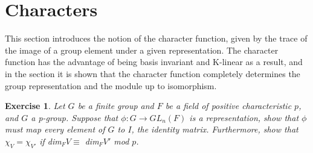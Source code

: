 \documentclass{article}
\newtheorem{exercise}{Exercise}[section]
\begin{document}
\section{Characters}

This section introduces the notion of the character function, given by the trace of the image of a group element under a given representation. The character function has the advantage of being basis invariant and K-linear as a result, and in the section it is shown that the character function completely determines the group representation and the module up to isomorphism.

\begin{exercise}
Let $G$ be a finite group and $F$ be a field of positive
characteristic $p$, and $G$ a p-group. Suppose that $\phi: G \to GL_{n}(F)$ is a representation, show that $\phi$ must map every element of $G$ to $I$, the identity matrix. Furthermore, show that $\chi_{V}= \chi_{V'}$ if dim$_{F}V \equiv$ dim$_{F}V'$ mod $p$. 
\end{exercise}
\end{document}
